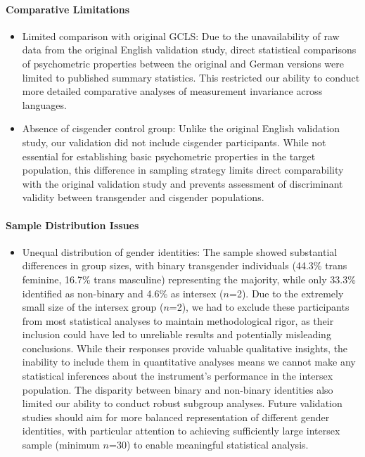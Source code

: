 \documentclass[12pt,a4paper]{article}
\begin{document}
\paragraph{Comparative Limitations}
\begin{itemize}
\item Limited comparison with original GCLS: Due to the unavailability of raw data from the original English validation study, direct statistical comparisons of psychometric properties between the original and German versions were limited to published summary statistics. This restricted our ability to conduct more detailed comparative analyses of measurement invariance across languages.
\item Absence of cisgender control group: Unlike the original English validation study, our validation did not include cisgender participants. While not essential for establishing basic psychometric properties in the target population, this difference in sampling strategy limits direct comparability with the original validation study and prevents assessment of discriminant validity between transgender and cisgender populations.
\end{itemize}

\paragraph{Sample Distribution Issues}
\begin{itemize}
\item Unequal distribution of gender identities: The sample showed substantial differences in group sizes, with binary transgender individuals (44.3\% trans feminine, 16.7\% trans masculine) representing the majority, while only 33.3\% identified as non-binary and 4.6\% as intersex ($n$=2). Due to the extremely small size of the intersex group ($n$=2), we had to exclude these participants from most statistical analyses to maintain methodological rigor, as their inclusion could have led to unreliable results and potentially misleading conclusions. While their responses provide valuable qualitative insights, the inability to include them in quantitative analyses means we cannot make any statistical inferences about the instrument's performance in the intersex population. The disparity between binary and non-binary identities also limited our ability to conduct robust subgroup analyses. Future validation studies should aim for more balanced representation of different gender identities, with particular attention to achieving sufficiently large intersex sample (minimum $n$=30) to enable meaningful statistical analysis.
\end{itemize}
\end{document}
